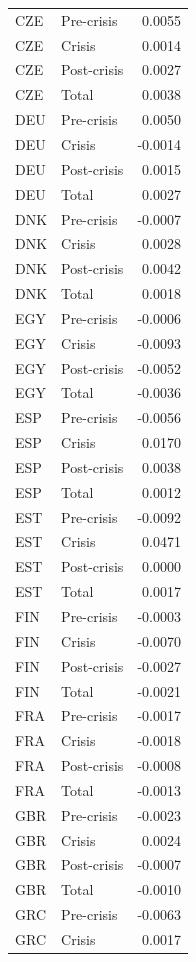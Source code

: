 \begin{longtable}[t]{llr}
CZE & Pre-crisis & 0.0055\\
CZE & Crisis & 0.0014\\
CZE & Post-crisis & 0.0027\\
\addlinespace
CZE & Total & 0.0038\\
DEU & Pre-crisis & 0.0050\\
DEU & Crisis & -0.0014\\
DEU & Post-crisis & 0.0015\\
DEU & Total & 0.0027\\
\addlinespace
DNK & Pre-crisis & -0.0007\\
DNK & Crisis & 0.0028\\
DNK & Post-crisis & 0.0042\\
DNK & Total & 0.0018\\
EGY & Pre-crisis & -0.0006\\
\addlinespace
EGY & Crisis & -0.0093\\
EGY & Post-crisis & -0.0052\\
EGY & Total & -0.0036\\
ESP & Pre-crisis & -0.0056\\
ESP & Crisis & 0.0170\\
\addlinespace
ESP & Post-crisis & 0.0038\\
ESP & Total & 0.0012\\
EST & Pre-crisis & -0.0092\\
EST & Crisis & 0.0471\\
EST & Post-crisis & 0.0000\\
\addlinespace
EST & Total & 0.0017\\
FIN & Pre-crisis & -0.0003\\
FIN & Crisis & -0.0070\\
FIN & Post-crisis & -0.0027\\
FIN & Total & -0.0021\\
\addlinespace
FRA & Pre-crisis & -0.0017\\
FRA & Crisis & -0.0018\\
FRA & Post-crisis & -0.0008\\
FRA & Total & -0.0013\\
GBR & Pre-crisis & -0.0023\\
\addlinespace
GBR & Crisis & 0.0024\\
GBR & Post-crisis & -0.0007\\
GBR & Total & -0.0010\\
GRC & Pre-crisis & -0.0063\\
GRC & Crisis & 0.0017\\

\end{longtable}
